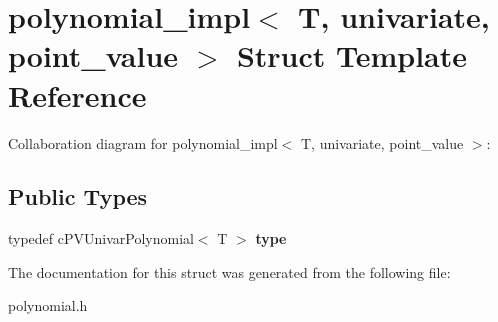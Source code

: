 \hypertarget{structpolynomial__impl_3_01T_00_01univariate_00_01point__value_01_4}{\section{polynomial\-\_\-impl$<$ T, univariate, point\-\_\-value $>$ Struct Template Reference}
\label{structpolynomial__impl_3_01T_00_01univariate_00_01point__value_01_4}
}


Collaboration diagram for polynomial\-\_\-impl$<$ T, univariate, point\-\_\-value $>$\-:
\subsection*{Public Types}
\begin{DoxyCompactItemize}
\item 
\hypertarget{structpolynomial__impl_3_01T_00_01univariate_00_01point__value_01_4_a83fba15a86add8b4b76e568c37e366b6}{typedef c\-P\-V\-Univar\-Polynomial$<$ T $>$ {\bfseries type}}\label{structpolynomial__impl_3_01T_00_01univariate_00_01point__value_01_4_a83fba15a86add8b4b76e568c37e366b6}

\end{DoxyCompactItemize}


The documentation for this struct was generated from the following file\-:\begin{DoxyCompactItemize}
\item 
polynomial.\-h\end{DoxyCompactItemize}
